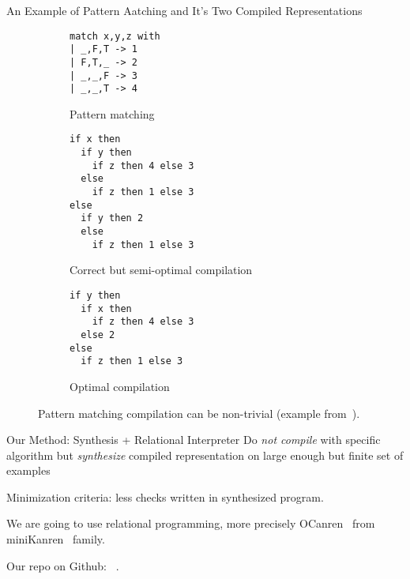 \documentclass[aspectratio=169
  , xcolor={svgnames}
  , hyperref={ colorlinks,citecolor=Blue
             , linkcolor=DarkRed,urlcolor=DarkBlue}
  , russian
  ]{beamer}
\begin{document}
\begin{frame}[fragile]{An Example of Pattern Aatching and It's Two Compiled Representations}
\begin{figure}[ht]
\begin{subfigure}[b]{0.25\linewidth}
\begin{lstlisting}
match x,y,z with
| _,F,T -> 1
| F,T,_ -> 2
| _,_,F -> 3
| _,_,T -> 4
\end{lstlisting}
\caption{Pattern matching}
\end{subfigure}
\hspace{0.5cm}
\begin{subfigure}[b]{0.32\linewidth}
\begin{lstlisting}
if x then
  if y then
    if z then 4 else 3
  else
    if z then 1 else 3
else
  if y then 2
  else
    if z then 1 else 3
\end{lstlisting}
\caption{Correct but semi-optimal compilation}
\label{fig:matching-example2}
\end{subfigure}
\hspace{0.5cm}
\begin{subfigure}[b]{0.3\linewidth}
\centering
\begin{lstlisting}
if y then
  if x then
    if z then 4 else 3
  else 2
else
  if z then 1 else 3
\end{lstlisting}
\caption{Optimal compilation}
\label{fig:matching-example3}
\end{subfigure}
\caption{Pattern matching compilation can be non-trivial (example from~\cite{maranget2008}).}
\label{fig:match-example}
\end{figure}
\end{frame}

\begin{frame}{Our Method: Synthesis + Relational Interpreter}
Do \emph{not compile} with specific algorithm but \emph{synthesize} compiled representation on large enough but finite set of examples
\vspace{1cm}

Minimization criteria: less checks written in synthesized program.
\vspace{1cm}

We are going to use relational programming, more precisely OCanren~\cite{OCanrenWeb} from miniKanren~\cite{MiniKanrenWeb} family.
\vspace{1cm}


Our repo on Github: ~\cite{Repo}.
\end{frame}
\end{document}
